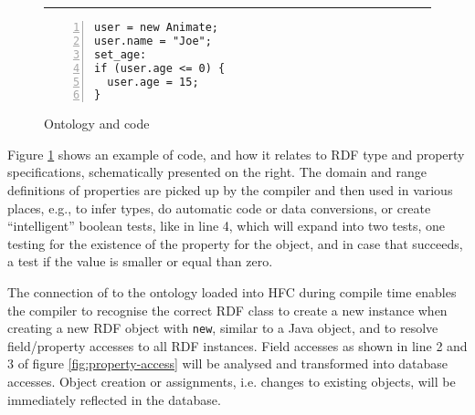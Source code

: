 \begin{figure}[htb]
\rule{7mm}{0pt}\begin{minipage}{0.45\columnwidth}
\small%
\begin{lstlisting}[numbers=left,numberstyle=\scriptsize]
user = new Animate;
user.name = "Joe";
set_age:
if (user.age <= 0) {
  user.age = 15;
}
\end{lstlisting}
\end{minipage}\vrule\hspace{1ex}
\begin{minipage}{0.44\columnwidth}
    \small{}
\end{minipage}
  \caption{Ontology and \vonda code}
  \label{fig:rdfobjects}
\end{figure}

Figure \ref{fig:rdfobjects} shows an example of \vonda code, and how it relates
to RDF type and property specifications, schematically presented on the right.
The domain and range definitions of properties are picked up by the compiler
and then used in various places, e.g., to infer types, do automatic code or
data conversions, or create ``intelligent'' boolean tests, like in line 4,
which will expand into two tests, one testing for the existence of the property
for the object, and in case that succeeds, a test if the value is smaller or
equal than zero.

The connection of \vonda to the ontology loaded into HFC during compile time
enables the compiler to recognise the correct RDF class to create a new
instance when creating a new RDF object with \texttt{new}, similar to a Java
object, and to resolve field/property accesses to all RDF instances. Field
accesses as shown in line 2 and 3 of figure \ref{fig:property-access} will be
analysed and transformed into database accesses. Object creation or
assignments, i.e. changes to existing objects, will be immediately reflected in
the database.


